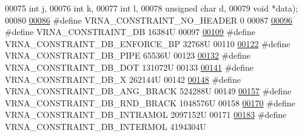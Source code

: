 \begin{DoxyCode}
00075                                                   \textcolor{keywordtype}{int}           j,
00076                                                   \textcolor{keywordtype}{int}           k,
00077                                                   \textcolor{keywordtype}{int}           l,
00078                                                   \textcolor{keywordtype}{unsigned} \textcolor{keywordtype}{char} d,
00079                                                   \textcolor{keywordtype}{void}          *data);
00080 
\mbox{\hyperlink{constraints__hard_8h_a08d12a9a846ea593b7171d277c9f033f}{00086}} \textcolor{preprocessor}{#define VRNA\_CONSTRAINT\_NO\_HEADER         0}
00087 
\mbox{\hyperlink{group__hard__constraints_ga4bfc2f15c4f261c62a11af9d2aa80c90}{00096}} \textcolor{preprocessor}{#define VRNA\_CONSTRAINT\_DB                16384U}
00097 
\mbox{\hyperlink{group__hard__constraints_ga29ebe940110d60ab798fdacbcdbbfb7d}{00109}} \textcolor{preprocessor}{#define VRNA\_CONSTRAINT\_DB\_ENFORCE\_BP           32768U}
00110 
\mbox{\hyperlink{group__hard__constraints_ga13053547a2de5532b64b64d35e097ae1}{00122}} \textcolor{preprocessor}{#define VRNA\_CONSTRAINT\_DB\_PIPE              65536U}
00123 
\mbox{\hyperlink{group__hard__constraints_ga369bea82eae75fbe626f409fa425747e}{00132}} \textcolor{preprocessor}{#define VRNA\_CONSTRAINT\_DB\_DOT               131072U}
00133 
\mbox{\hyperlink{group__hard__constraints_ga7283bbe0f8954f7b030ecc3f2d1932b2}{00141}} \textcolor{preprocessor}{#define VRNA\_CONSTRAINT\_DB\_X                 262144U}
00142 
\mbox{\hyperlink{constraints__hard_8h_ad54c1315a47d55653dcaa5de6e544b77}{00148}} \textcolor{preprocessor}{#define VRNA\_CONSTRAINT\_DB\_ANG\_BRACK         524288U}
00149 
\mbox{\hyperlink{group__hard__constraints_gac17b034852c914bc5879954c65d7e74b}{00157}} \textcolor{preprocessor}{#define VRNA\_CONSTRAINT\_DB\_RND\_BRACK         1048576U}
00158 
\mbox{\hyperlink{group__hard__constraints_ga5c17253f5a39d1d49b0fb11f5196982a}{00170}} \textcolor{preprocessor}{#define VRNA\_CONSTRAINT\_DB\_INTRAMOL    2097152U}
00171 
\mbox{\hyperlink{group__hard__constraints_ga31d0ebb9755ca8a4acafc14f00ca755d}{00183}} \textcolor{preprocessor}{#define VRNA\_CONSTRAINT\_DB\_INTERMOL    4194304U}

\end{DoxyCode}
